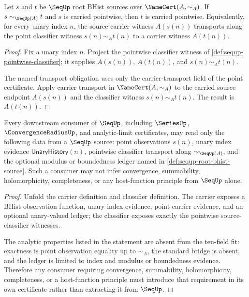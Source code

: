 \begin{theorem}
\label{thm:sequp-pointwise-transport-obligation}
Let $s$ and $t$ be $\SeqUp$ root BHist sources over $\NameCert(A,\sim_A)$. If $s\sim_{\SeqUp(A)}t$ and $s$ is carried pointwise, then $t$ is carried pointwise. Equivalently, for every unary index $n$, the source carrier witness $A(s(n))$ transports along the point classifier witness $s(n)\sim_A t(n)$ to a carrier witness $A(t(n))$.
\end{theorem}

\begin{proof}
Fix a unary index $n$. Project the pointwise classifier witness of \autoref{def:sequp-pointwise-classifier}; it supplies $A(s(n))$, $A(t(n))$, and $s(n)\sim_A t(n)$.

The named transport obligation uses only the carrier-transport field of the point certificate. Apply carrier transport in $\NameCert(A,\sim_A)$ to the carried source endpoint $A(s(n))$ and the classifier witness $s(n)\sim_A t(n)$. The result is $A(t(n))$.
\end{proof}

\begin{theorem}
\label{thm:sequp-downstream-boundary}
Every downstream consumer of $\SeqUp$, including $\SeriesUp$, $\ConvergenceRadiusUp$, and analytic-limit certificates, may read only the following data from a $\SeqUp$ source: point observations $s(n)$, unary index evidence $\mathsf{UnaryHistory}(n)$, pointwise classifier transport along $\sim_{\SeqUp(A)}$, and the optional modulus or boundedness ledger named in \autoref{def:sequp-root-bhist-source}. Such a consumer may not infer convergence, summability, holomorphicity, completeness, or any host-function principle from $\SeqUp$ alone.
\end{theorem}

\begin{proof}
Unfold the carrier definition and classifier definition. The carrier exposes a BHist observation function, unary-index evidence, point carrier evidence, and an optional unary-valued ledger; the classifier exposes exactly the pointwise source-classifier witnesses.

The analytic properties listed in the statement are absent from the ten-field fit: exactness is point observation equality up to $\sim_A$, the standard bridge is absent, and the ledger is limited to index and modulus or boundedness evidence. Therefore any consumer requiring convergence, summability, holomorphicity, completeness, or a host-function principle must introduce that requirement in its own certificate rather than extracting it from $\SeqUp$.
\end{proof}

